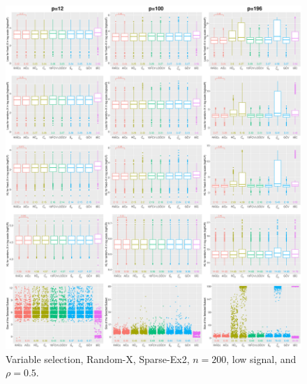 \begin{figure}[!ht]
\centering
\includegraphics[width=\textwidth]{figures/supplement/randomx/subset_selection/Sparse-Ex2_n200_lsnr_rho05.eps}
\caption{Variable selection, Random-X, Sparse-Ex2, $n=200$, low signal, and $\rho=0.5$.}
\end{figure}
\clearpage
